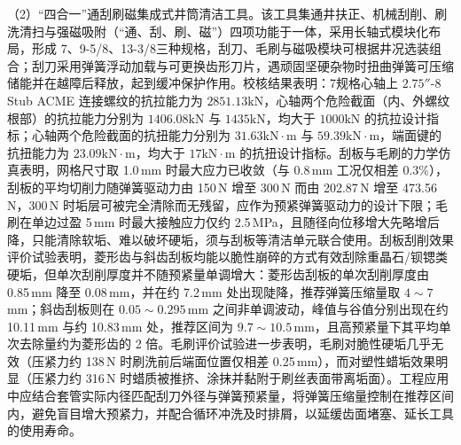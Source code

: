 （2）“四合一”通刮刷磁集成式井筒清洁工具。该工具集通井扶正、机械刮削、刷洗清扫与强磁吸附（“通、刮、刷、磁”）四项功能于一体，采用长轴式模块化布局，形成 7\inch、9-5/8\inch、13-3/8\inch 三种规格，刮刀、毛刷与磁吸模块可根据井况选装组合；刮刀采用弹簧浮动加载与可更换齿形刀片，遇顽固坚硬杂物时扭曲弹簧可压缩储能并在越障后释放，起到缓冲保护作用。校核结果表明：7\inch 规格心轴上 $2.75''\text{-}8$ Stub ACME 连接螺纹的抗拉能力为 $2851.13\mathrm{kN}$，心轴两个危险截面（内、外螺纹根部）的抗拉能力分别为 $1406.08\mathrm{kN}$ 与 $1435\mathrm{kN}$，均大于 $1000\mathrm{kN}$ 的抗拉设计指标；心轴两个危险截面的抗扭能力分别为 $31.63\mathrm{kN\cdot m}$ 与 $59.39\mathrm{kN\cdot m}$，端面键的抗扭能力为 $23.09\mathrm{kN\cdot m}$，均大于 $17\mathrm{kN\cdot m}$ 的抗扭设计指标。刮板与毛刷的力学仿真表明，网格尺寸取 1.0\,mm 时最大应力已收敛（与 0.8\,mm 工况仅相差 0.3\%），刮板的平均切削力随弹簧驱动力由 150\,N 增至 300\,N 而由 202.87\,N 增至 473.56\,N，300\,N 时垢层可被完全清除而无残留，应作为预紧弹簧驱动力的设计下限；毛刷在单边过盈 5\,mm 时最大接触应力仅约 2.5\,MPa，且随径向位移增大先略增后降，只能清除软垢、难以破坏硬垢，须与刮板等清洁单元联合使用。刮板刮削效果评价试验表明，菱形齿与斜齿刮板均能以脆性崩碎的方式有效刮除重晶石/钡锶类硬垢，但单次刮削厚度并不随预紧量单调增大：菱形齿刮板的单次刮削厚度由 0.85\,mm 降至 0.08\,mm，并在约 7.2\,mm 处出现陡降，推荐弹簧压缩量取 $4\sim7$\,mm；斜齿刮板则在 $0.05\sim0.295$\,mm 之间非单调波动，峰值与谷值分别出现在约 10.11\,mm 与约 10.83\,mm 处，推荐区间为 $9.7\sim10.5$\,mm，且高预紧量下其平均单次去除量约为菱形齿的 2 倍。毛刷评价试验进一步表明，毛刷对脆性硬垢几乎无效（压紧力约 138\,N 时刷洗前后端面位置仅相差 0.25\,mm），而对塑性蜡垢效果明显（压紧力约 316\,N 时蜡质被推挤、涂抹并黏附于刷丝表面带离垢面）。工程应用中应结合套管实际内径匹配刮刀外径与弹簧预紧量，将弹簧压缩量控制在推荐区间内，避免盲目增大预紧力，并配合循环冲洗及时排屑，以延缓齿面堵塞、延长工具的使用寿命。

